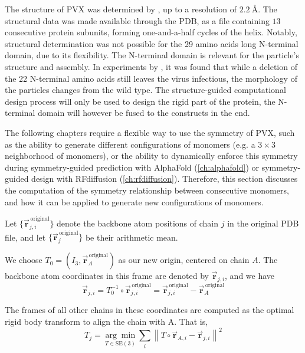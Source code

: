 The structure of PVX was determined by \cite{Grinzato2020}, up to a resolution of $\SI{2.2}{\angstrom}$. The structural data was made available through the PDB, as a file containing $13$ consecutive protein subunits, forming one-and-a-half cycles of the helix. Notably, structural determination was not possible for the 29 amino acids long N-terminal domain, due to its flexibility. The N-terminal domain is relevant for the particle's structure and assembly. In experiments by \cite{del22_rigid}, it was found that while a deletion of the 22 N-terminal amino acids still leaves the virus infectious, the morphology of the particles changes from the wild type. The structure-guided computational design process will only be used to design the rigid part of the protein, the N-terminal domain will however be fused to the constructs in the end. 

The following chapters require a flexible way to use the symmetry of PVX, such as the ability to generate different configurations of monomers (e.g. a $3 \times 3$ neighborhood of monomers), or the ability to dynamically enforce this symmetry during symmetry-guided prediction with AlphaFold (\autoref{ch:alphafold}) or symmetry-guided design with RFdiffusion (\autoref{ch:rfdiffusion}). Therefore, this section discusses the computation of the symmetry relationship between consecutive monomers, and how it can be applied to generate new configurations of monomers.

Let $\{\vec{\mathbf{r}}_{j,i}^{\,\text{original}}\}$ denote the backbone atom positions of chain $j$ in the original PDB file, and let $\{\vec{\mathbf{r}}_{j}^{\,\text{original}}\}$ be their arithmetic mean. 

We choose $T_0 = (I_3, \vec{\mathbf{r}}_A^{\,\text{original}})$ as our new origin, centered on chain $A$. The backbone atom coordinates in this frame are denoted by $\vec{\mathbf{r}}_{j,i}$, and we have
\begin{equation}
    \vec{\mathbf{r}}_{j,i} = T_0^{-1} \circ \vec{\mathbf{r}}_{j,i}^{\,\text{original}} = \vec{\mathbf{r}}_{j,i}^{\,\text{original}} - \vec{\mathbf{r}}_{A}^{\,\text{original}}
\end{equation}

The frames of all other chains in these coordinates are computed as the optimal rigid body transform to align the chain with A. That is,
\begin{equation}
T_j = \underset{T \in \mathrm{SE}(3)}{\arg\min} \sum_i \left\| T\circ\vec{\mathbf{r}}_{A,i} - \vec{\mathbf{r}}_{j,i} \right\|^2
\end{equation}

